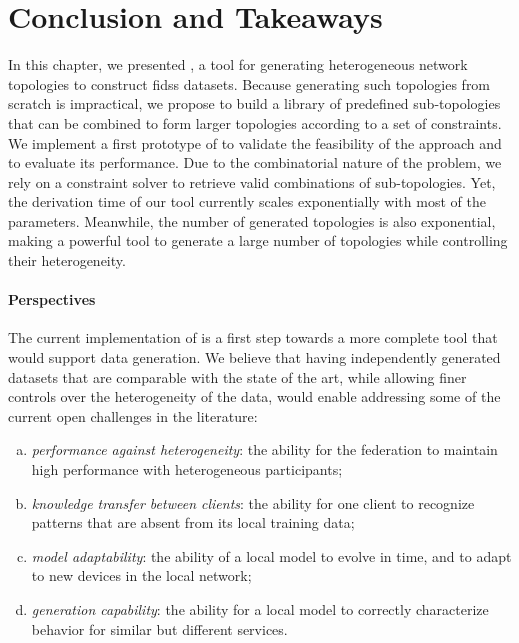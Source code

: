 \section{Conclusion and Takeaways\label{sec:topologies.conclusion}}

In this chapter, we presented \thecontrib, a tool for generating heterogeneous network topologies to construct \glspl{fids} datasets.
Because generating such topologies from scratch is impractical, we propose to build a library of predefined sub-topologies that can be combined to form larger topologies according to a set of constraints.
We implement a first prototype of \thecontrib to validate the feasibility of the approach and to evaluate its performance.
Due to the combinatorial nature of the problem, we rely on a constraint solver to retrieve valid combinations of sub-topologies.
Yet, the derivation time of our tool currently scales exponentially with most of the parameters.
Meanwhile, the number of generated topologies is also exponential, making \thecontrib a powerful tool to generate a large number of topologies while controlling their heterogeneity.


\paragraph{Perspectives}

The current implementation of \thecontrib is a first step towards a more complete tool that would support data generation.
We believe that having independently generated datasets that are comparable with the state of the art, while allowing finer controls over the heterogeneity of the data, would enable addressing some of the current open challenges in the literature:
\begin{enumerate}[(a)]
  \item \emph{performance against heterogeneity}: the ability for the federation to maintain high
  performance with heterogeneous participants;
  \item \emph{knowledge transfer between clients}: the ability for one client to recognize
  patterns that are absent from its local training data;
  \item \emph{model adaptability}: the ability of a local model to evolve in time, and to adapt to
  new devices in the local network;
  \item \emph{generation capability}: the ability for a local model to correctly characterize
  behavior for similar but different services.
\end{enumerate}


